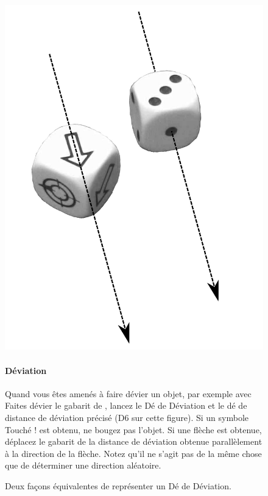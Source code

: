 \begin{figure}[!htbp]
\begin{minipage}{0.3\textwidth}
\includegraphics[width=\textwidth]{pics/deviation_dice.png}
\caption{Deux façons équivalentes de représenter un Dé de Déviation.}
\label{figure/deviation_dice}
\end{minipage}\hfill
\begin{minipage}{0.67\textwidth}
\paragraph{Déviation}

Quand vous êtes amenés à faire dévier un objet, par exemple avec \og Faites dévier le gabarit de  \fg{}, lancez le Dé de Déviation et le dé de distance de déviation précisé (D6 sur cette figure). Si un symbole \og Touché ! \fg{} est obtenu, ne bougez pas l'objet. Si une flèche est obtenue, déplacez le gabarit de la distance de déviation obtenue parallèlement à la direction de la flèche. Notez qu'il ne s'agit pas de la même chose que de déterminer une direction aléatoire.


\end{minipage}
\end{figure}
